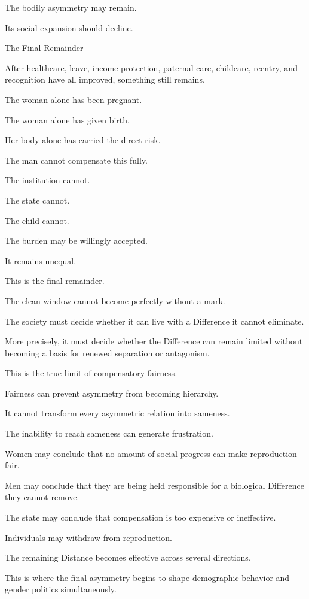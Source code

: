 The bodily asymmetry may remain.

Its social expansion should decline.

The Final Remainder

After healthcare, leave, income protection, paternal care, childcare, reentry, and recognition have all improved, something still remains.

The woman alone has been pregnant.

The woman alone has given birth.

Her body alone has carried the direct risk.

The man cannot compensate this fully.

The institution cannot.

The state cannot.

The child cannot.

The burden may be willingly accepted.

It remains unequal.

This is the final remainder.

The clean window cannot become perfectly without a mark.

The society must decide whether it can live with a Difference it cannot eliminate.

More precisely, it must decide whether the Difference can remain limited without becoming a basis for renewed separation or antagonism.

This is the true limit of compensatory fairness.

Fairness can prevent asymmetry from becoming hierarchy.

It cannot transform every asymmetric relation into sameness.

The inability to reach sameness can generate frustration.

Women may conclude that no amount of social progress can make reproduction fair.

Men may conclude that they are being held responsible for a biological Difference they cannot remove.

The state may conclude that compensation is too expensive or ineffective.

Individuals may withdraw from reproduction.

The remaining Distance becomes effective across several directions.

This is where the final asymmetry begins to shape demographic behavior and gender politics simultaneously.

